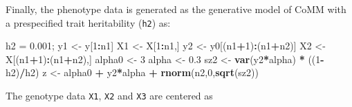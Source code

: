 \documentclass[]{article}
\newenvironment{Shaded}{\begin{snugshade}}{\end{snugshade}}
\newcommand{\KeywordTok}[1]{\textcolor[rgb]{0.13,0.29,0.53}{\textbf{#1}}}
\newcommand{\DecValTok}[1]{\textcolor[rgb]{0.00,0.00,0.81}{#1}}
\newcommand{\FloatTok}[1]{\textcolor[rgb]{0.00,0.00,0.81}{#1}}
\newcommand{\StringTok}[1]{\textcolor[rgb]{0.31,0.60,0.02}{#1}}
\newcommand{\OperatorTok}[1]{\textcolor[rgb]{0.81,0.36,0.00}{\textbf{#1}}}
\newcommand{\NormalTok}[1]{#1}
\begin{document}
\begin{Shaded}
\end{Shaded}

Finally, the phenotype data is generated as the generative model of CoMM
with a prespecified trait heritability (\texttt{h2}) as:

\begin{Shaded}
\begin{Highlighting}[]
\NormalTok{h2 =}\StringTok{ }\FloatTok{0.001}\NormalTok{;}
\NormalTok{y1 <-}\StringTok{ }\NormalTok{y[}\DecValTok{1}\OperatorTok{:}\NormalTok{n1]}
\NormalTok{X1 <-}\StringTok{ }\NormalTok{X[}\DecValTok{1}\OperatorTok{:}\NormalTok{n1,]}
\NormalTok{y2 <-}\StringTok{ }\NormalTok{y0[(n1}\OperatorTok{+}\DecValTok{1}\NormalTok{)}\OperatorTok{:}\NormalTok{(n1}\OperatorTok{+}\NormalTok{n2)]}
\NormalTok{X2 <-}\StringTok{ }\NormalTok{X[(n1}\OperatorTok{+}\DecValTok{1}\NormalTok{)}\OperatorTok{:}\NormalTok{(n1}\OperatorTok{+}\NormalTok{n2),]}
\NormalTok{alpha0 <-}\StringTok{ }\DecValTok{3}  
\NormalTok{alpha <-}\StringTok{ }\FloatTok{0.3}
\NormalTok{sz2 <-}\StringTok{ }\KeywordTok{var}\NormalTok{(y2}\OperatorTok{*}\NormalTok{alpha) }\OperatorTok{*}\StringTok{ }\NormalTok{((}\DecValTok{1}\OperatorTok{-}\NormalTok{h2)}\OperatorTok{/}\NormalTok{h2)}
\NormalTok{z <-}\StringTok{ }\NormalTok{alpha0 }\OperatorTok{+}\StringTok{ }\NormalTok{y2}\OperatorTok{*}\NormalTok{alpha }\OperatorTok{+}\StringTok{ }\KeywordTok{rnorm}\NormalTok{(n2,}\DecValTok{0}\NormalTok{,}\KeywordTok{sqrt}\NormalTok{(sz2))}
\end{Highlighting}
\end{Shaded}

The genotype data \texttt{X1}, \texttt{X2} and \texttt{X3} are centered
as
\end{document}
